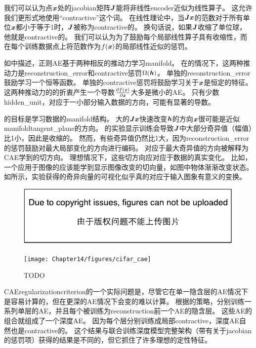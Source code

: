 我们可以认为点$\boldsymbol{\mathit{x}}$处的\gls{jacobian}矩阵$\boldsymbol{\mathit{J}}$能将非线性\gls{encoder}近似为线性算子。
这允许我们更形式地使用``\gls{contractive}''这个词。
在线性理论中，当$\boldsymbol{\mathit{J}}\boldsymbol{\mathit{x}}$的范数对于所有单位$\boldsymbol{\mathit{x}}$都小于等于1时，$\boldsymbol{\mathit{J}}$被称为\gls{contractive}的。
换句话说，如果$\boldsymbol{\mathit{J}}$收缩了单位球，他就是\gls{contractive}的。
我们可以认为为了鼓励每个局部线性算子具有收缩性，而在每个训练数据点上将范数作为$f(\boldsymbol{\mathit{x}})$的局部线性近似的惩罚。


如中描述，正则\gls{AE}基于两种相反的推动力学习\gls{manifold}。
在的情况下，这两种推动力是\gls{reconstruction_error}和\gls{contractive}惩罚$\Omega(\boldsymbol{\mathit{h}})$。
单独的\gls{reconstruction_error}鼓励学习一个恒等函数。
单独的\gls{contractive}惩罚将鼓励学习关于$\boldsymbol{\mathit{x}}$是恒定的特征。
这两种推动力的的折衷产生一个导数$\frac{\partial f(\boldsymbol{\mathit{x}})}{\partial \boldsymbol{\mathit{x}}}$大多是微小的\gls{AE}。
只有少数\gls{hidden_unit}，对应于一小部分输入数据的方向，可能有显著的导数。


的目标是学习数据的\gls{manifold}结构。
大的$\boldsymbol{\mathit{J}}\boldsymbol{\mathit{x}}$快速改变$\boldsymbol{\mathit{h}}$的方向$\boldsymbol{\mathit{x}}$很可能是近似\gls{manifold}\gls{tangent_plane}的方向。
\citet{Rifai+al-2011-small,Salah+al-2011-small}的实验显示训练会导致$\boldsymbol{\mathit{J}}$中大部分奇异值（幅值）比1小，因此是收缩的。
然而，有些奇异值仍然比1大，因为\gls{reconstruction_error}的惩罚鼓励对最大局部变化的方向进行编码。
对应于最大奇异值的方向被解释为\gls{CAE}学到的切方向。
理想情况下，这些切方向应对应于数据的真实变化。
比如，一个应用于图像的应该能学到显示图像改变的切向量，如图中物体渐渐改变状态。
如所示，实验获得的奇异向量的可视化似乎真的对应于输入图象有意义的变换。


\begin{figure}[!htb]
\ifOpenSource
\centerline{\includegraphics{figure.pdf}}
\else
\centerline{\texttt{[image: Chapter14/figures/cifar\_cae]}}
\fi
\caption{TODO}
\label{fig:chap14_cifar_cae}
\end{figure}

\gls{CAE}\gls{regularization}\gls{criterion}的一个实际问题是，尽管它在单一隐含层的\gls{AE}情况下是容易计算的，但在更深的\gls{AE}情况下会变的难以计算。
根据\citet{Rifai+al-2011-small}的策略，分别训练一系列单层的\gls{AE}，并且每个被训练为\gls{reconstruction}前一个\gls{AE}的隐含层。
这些\gls{AE}的组合就组成了一个深度\gls{AE}。
因为每个层分别训练成局部\gls{contractive}，深度\gls{AE}自然也是\gls{contractive}的。
这个结果与联合训练深度模型完整架构（带有关于\gls{jacobian}的惩罚项）获得的结果是不同的，但它抓住了许多理想的定性特征。


